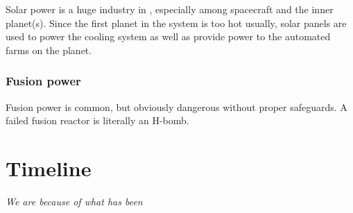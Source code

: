 Solar power is a huge industry in , especially among spacecraft and
the inner planet(s). Since the first planet in the system is too hot usually,
solar panels are used to power the cooling system as well as provide power to
the automated farms on the planet.

\subsubsection{Fusion power}
\label{sec:fusion-power}

Fusion power is common, but obviously dangerous without proper safeguards. A
failed fusion reactor is literally an H-bomb.



\section{Timeline}
\label{sec:timeline}

\begin{center}
  \textit{We are because of what has been}
\end{center}

\NewDocumentCommand{}


